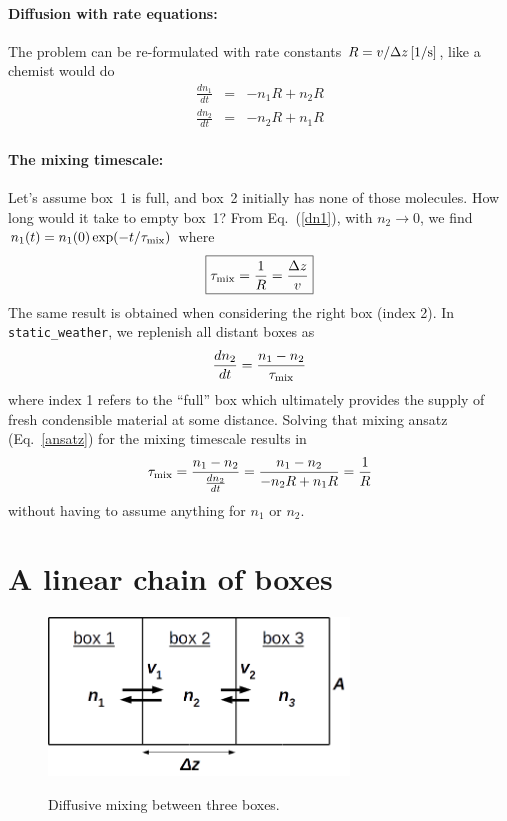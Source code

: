 \documentclass[11pt]{article}
\begin{document}
\paragraph{Diffusion with rate equations:}
The problem can be re-formulated with rate constants
$R=v/\Delta z \rm\,[1/s]$, like a chemist would do
\begin{eqnarray}
  \frac{dn_1}{dt} &=& -n_1 R + n_2 R \label{dn1}\\
  \frac{dn_2}{dt} &=& -n_2 R + n_1 R
\end{eqnarray}

\paragraph{The mixing timescale:}
Let's assume box~1 is full, and box~2 initially has none of those molecules. 
How long would it take to empty box~1? From Eq.~(\ref{dn1}), with
$n_2\to 0$, we find $n_1(t) = n_1(0) \exp(-t/\tau_{\rm mix})$ where
\begin{equation}  
  \boxed{\tau_{\rm mix} = \frac{1}{R} = \frac{\Delta z}{v}}
  \label{tmix1}
\end{equation}
The same result is obtained when considering the right box (index 2).
In {\tt static\_weather}, we replenish all distant boxes as
\begin{equation}
  \frac{dn_2}{dt} = \frac{n_1-n_2}{\tau_{\rm mix}}
  \label{ansatz}
\end{equation}
where index 1 refers to the ``full'' box which ultimately provides the
supply of fresh condensible material at some distance. Solving that
mixing ansatz (Eq.~\ref{ansatz}) for the mixing timescale results in 
\begin{equation}
  {\tau_{\rm mix}} = \frac{n_1-n_2}{\frac{dn_2}{dt}}
                  = \frac{n_1-n_2}{-n_2 R + n_1 R}
                  = \frac{1}{R}
\end{equation}
without having to assume anything for $n_1$ or $n_2$.

\section{A linear chain of boxes}

\begin{figure}[h!]
\centering
\includegraphics[width=8cm]{box3.png}\\[-5mm]
\caption{Diffusive mixing between three boxes.}
\label{3boxes}
\end{figure}
\end{document}
